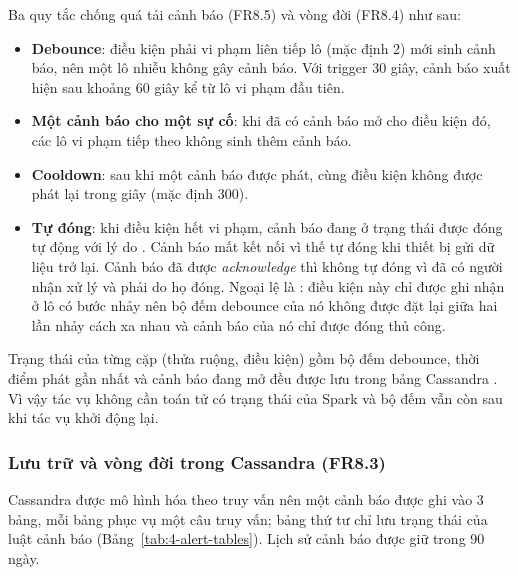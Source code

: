 Ba quy tắc chống quá tải cảnh báo (FR8.5) và vòng đời (FR8.4) như sau:

\begin{itemize}
  \item \textbf{Debounce}: điều kiện phải vi phạm liên tiếp  lô (mặc định 2) mới sinh cảnh báo, nên một lô nhiễu không gây cảnh báo. Với trigger 30 giây, cảnh báo xuất hiện sau khoảng 60 giây kể từ lô vi phạm đầu tiên.
  \item \textbf{Một cảnh báo cho một sự cố}: khi đã có cảnh báo mở cho điều kiện đó, các lô vi phạm tiếp theo không sinh thêm cảnh báo.
  \item \textbf{Cooldown}: sau khi một cảnh báo được phát, cùng điều kiện không được phát lại trong  giây (mặc định 300).
  \item \textbf{Tự đóng}: khi điều kiện hết vi phạm, cảnh báo đang ở trạng thái  được đóng tự động với lý do . Cảnh báo mất kết nối vì thế tự đóng khi thiết bị gửi dữ liệu trở lại. Cảnh báo đã được \emph{acknowledge} thì không tự đóng vì đã có người nhận xử lý và phải do họ đóng. Ngoại lệ là : điều kiện này chỉ được ghi nhận ở lô có bước nhảy nên bộ đếm debounce của nó không được đặt lại giữa hai lần nhảy cách xa nhau và cảnh báo của nó chỉ được đóng thủ công.
\end{itemize}

Trạng thái của từng cặp (thửa ruộng, điều kiện) gồm bộ đếm debounce, thời điểm phát gần nhất và cảnh báo đang mở đều được lưu trong bảng Cassandra . Vì vậy tác vụ không cần toán tử có trạng thái của Spark và bộ đếm vẫn còn sau khi tác vụ khởi động lại.

\subsubsection{Lưu trữ và vòng đời trong Cassandra (FR8.3)}

Cassandra được mô hình hóa theo truy vấn nên một cảnh báo được ghi vào 3 bảng, mỗi bảng phục vụ một câu truy vấn; bảng thứ tư chỉ lưu trạng thái của luật cảnh báo (Bảng~\ref{tab:4-alert-tables}). Lịch sử cảnh báo được giữ trong 90 ngày.

